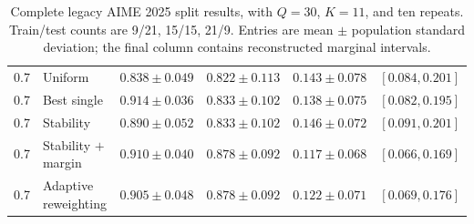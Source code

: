 \begin{table}[p]
\begin{tabular}{clcccc}
0.7 & Uniform & \(0.838\mathbin{\pm}0.049\) & \(0.822\mathbin{\pm}0.113\) & \(0.143\mathbin{\pm}0.078\) & \([0.084,0.201]\) \\
0.7 & Best single & \(0.914\mathbin{\pm}0.036\) & \(0.833\mathbin{\pm}0.102\) & \(0.138\mathbin{\pm}0.075\) & \([0.082,0.195]\) \\
0.7 & Stability & \(0.890\mathbin{\pm}0.052\) & \(0.833\mathbin{\pm}0.102\) & \(0.146\mathbin{\pm}0.072\) & \([0.091,0.201]\) \\
0.7 & Stability \(+\) margin & \(0.910\mathbin{\pm}0.040\) & \(0.878\mathbin{\pm}0.092\) & \(0.117\mathbin{\pm}0.068\) & \([0.066,0.169]\) \\
0.7 & Adaptive reweighting & \(0.905\mathbin{\pm}0.048\) & \(0.878\mathbin{\pm}0.092\) & \(0.122\mathbin{\pm}0.071\) & \([0.069,0.176]\) \\
\bottomrule
\end{tabular}
\caption{Complete legacy AIME 2025 split results, with \(Q=30\), \(K=11\), and ten repeats.  Train/test counts are 9/21, 15/15, 21/9.  Entries are mean \(\mathbin{\pm}\) population standard deviation; the final column contains reconstructed marginal intervals.}
\label{tab:legacy-full-aime2025}
\end{table}

